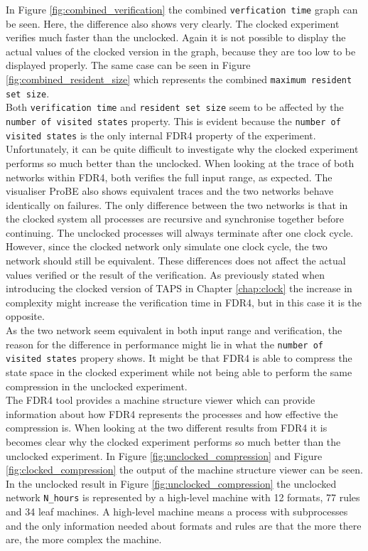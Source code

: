 In Figure \ref{fig:combined_verification} the combined \texttt{verfication time} graph can be seen. Here, the difference also shows very clearly. The clocked experiment verifies much faster than the unclocked. Again it is not possible to display the actual values of the clocked version in the graph, because they are too low to be displayed properly. The same case can be seen in Figure \ref{fig:combined_resident_size} which represents the combined \texttt{maximum resident set size}. \\

Both \texttt{verification time} and \texttt{resident set size} seem to be affected by the \texttt{number of visited states} property. This is evident because the
\texttt{number of visited states} is the only internal FDR4 property of the experiment. Unfortunately, it can be quite difficult to investigate why the clocked experiment performs so much better than the unclocked. When looking at the trace of both networks within FDR4, both verifies the full input range, as expected. The visualiser ProBE also shows equivalent traces and the two networks behave identically on failures. The only difference between the two networks is that in the clocked system all processes are recursive and synchronise together before continuing. The unclocked processes will always terminate after one clock cycle. However, since the clocked network only simulate one clock cycle, the two network should still be equivalent. These differences does not affect the actual values verified or the result of the verification. As previously stated when introducing the clocked version of TAPS in Chapter \ref{chap:clock} the increase in complexity might increase the verification time in FDR4, but in this case it is the opposite. \\

As the two network seem equivalent in both input range and verification, the reason for the difference in performance might lie in what the \texttt{number of visited states} propery shows. It might be that FDR4 is able to compress the state space in the clocked experiment while not being able to perform the same compression in the unclocked experiment. \\

The FDR4 tool provides a machine structure viewer which can provide information about how FDR4 represents the processes and how effective the compression is. When looking at the two different results from FDR4 it is becomes clear why the clocked experiment performs so much better than the unclocked experiment. In Figure \ref{fig:unclocked_compression} and Figure \ref{fig:clocked_compression} the output of the machine structure viewer can be seen. In the unclocked result in Figure \ref{fig:unclocked_compression} the unclocked network
\texttt{N\_hours} is represented by a high-level machine with 12 formats, 77 rules and 34 leaf machines. A high-level machine means a process with subprocesses and the only information needed about formats and rules are that the more there are, the more complex the machine. \\

